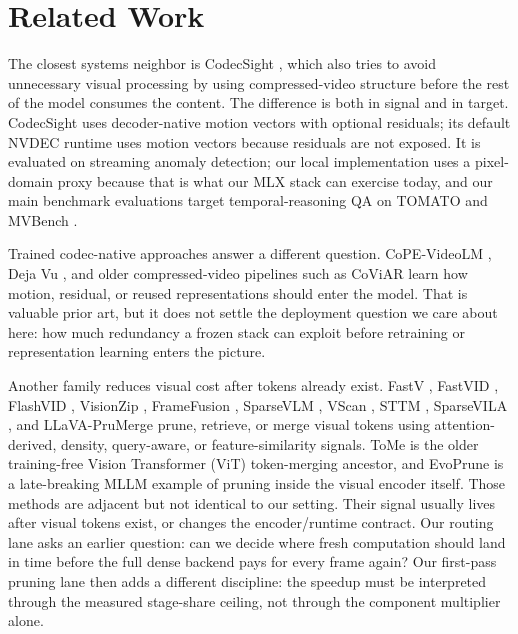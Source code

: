 \section{Related Work}

The closest systems neighbor is CodecSight \cite{codecsight}, which also tries
to avoid unnecessary visual processing by using compressed-video structure
before the rest of the model consumes the content. The difference is both in
signal and in target. CodecSight uses decoder-native motion vectors with
optional residuals; its default NVDEC runtime uses motion vectors because
residuals are not exposed. It is evaluated on streaming anomaly detection; our
local implementation uses a pixel-domain proxy because that is what our
MLX stack can exercise today, and our main benchmark evaluations target
temporal-reasoning QA on TOMATO \cite{tomato} and MVBench \cite{mvbench}.

Trained codec-native approaches answer a different question. CoPE-VideoLM
\cite{copevideolm}, Deja Vu \cite{dejavu}, and older compressed-video pipelines
such as CoViAR \cite{coviar} learn how motion, residual, or reused
representations should enter the model. That is valuable prior art, but it does
not settle the deployment question we care about here: how much redundancy a
frozen stack can exploit before retraining or representation learning enters
the picture.

Another family reduces visual cost after tokens already exist. FastV
\cite{fastv}, FastVID \cite{fastvid}, FlashVID \cite{flashvid}, VisionZip
\cite{visionzip}, FrameFusion \cite{framefusion}, SparseVLM
\cite{sparsevlm}, VScan \cite{vscan}, STTM
\cite{sttm}, SparseVILA \cite{sparsevila}, and LLaVA-PruMerge
\cite{llavaprumerge} prune, retrieve, or merge visual tokens using
attention-derived, density, query-aware, or feature-similarity signals. ToMe
\cite{tome} is the older training-free Vision Transformer (ViT)
token-merging ancestor, and
EvoPrune \cite{evoprune} is a late-breaking MLLM example of pruning inside
the visual encoder itself. Those methods are adjacent but not identical to our
setting. Their signal usually lives after visual tokens exist, or changes the
encoder/runtime contract. Our routing lane asks an earlier question: can we
decide where fresh computation should land in time before the full dense
backend pays for every frame again? Our first-pass pruning lane then adds a
different discipline: the speedup must be interpreted through the measured
stage-share ceiling, not through the component multiplier alone.

